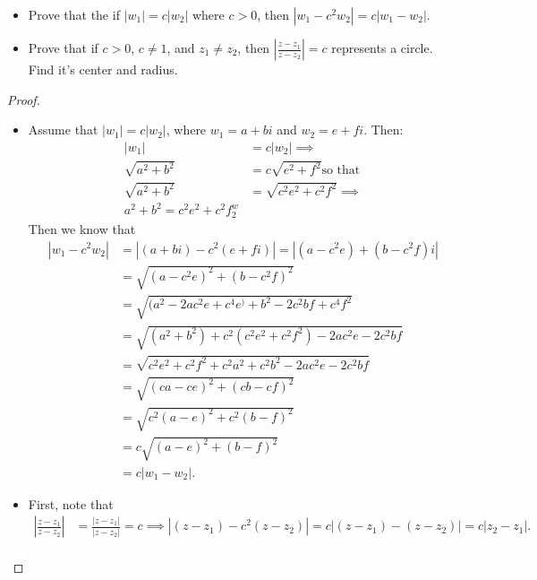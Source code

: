 \documentclass[12pt]{article}
\newenvironment{statement}[2][Statement]{\begin{trivlist}
\item[\hskip \labelsep {\bfseries #1}\hskip \labelsep {\bfseries #2.}]}{\end{trivlist}}
\begin{document}
\begin{statement}[Problem]{4}
  \begin{itemize}
    \item[(a)] Prove that the if $|w_1|=c|w_2|$ where $c > 0$, then $|w_1 - c^2 w_2| = c|w_1-w_2|$.
    \item[(b)] Prove that if $c >0$, $c \neq 1$, and $z_1 \neq z_2$, then $| \frac{z-z_1}{z-z_2} | = c$ represents a circle. 
      Find it's center and radius. 
  \end{itemize}
\end{statement}
\begin{proof}
  \begin{itemize}
    \item[(a)] Assume that $|w_1|=c|w_2|$, where $w_1=a+bi$ and $w_2=e+fi$. Then: 
      \begin{align*}
        |w_1| &= c|w_2| \implies \\
        \sqrt{a^2+b^2} &= c \sqrt{e^2+f^2} \text{so that} \\
        \sqrt{a^2+b^2} &= \sqrt{c^2e^2+c^2f^2} \implies \\
        a^2+b^2 = c^2e^2 + c^2f^w_2
      \end{align*}
      Then we know that 
      \begin{align*}
        |w_1 - c^2w_2| &= |(a+bi) - c^2(e+fi)|=|(a-c^2e)+(b-c^2f)i| \\
                       &= \sqrt{(a-c^2e)^2 + (b-c^ 2f)^2} \\
                       &= \sqrt{(a^2-2ac^2e+c^4e^)+b^2-2c^2bf+c^4f^2} \\
                       &= \sqrt{(a^2+b^2) + c^2(c^2e^2+c^2f^2)-2ac^2e-2c^2bf} \\
                       &= \sqrt{c^2e^2 + c^2f^2 +c^2a^2+c^2b^2-2ac^2e-2c^2bf} \\
                       &= \sqrt{(ca-ce)^2 + (cb-cf)^2} \\
                       &= \sqrt{c^2(a-e)^2 + c^2(b-f)^2} \\
                       &= c \sqrt{(a-e)^2 + (b-f)^2} \\
                       &= c|w_1-w_2|.
      \end{align*}
    \item[(b)] First, note that 
      \begin{align*}
        | \frac{z-z_1}{z-z_2}| &= \frac{|z-z_1|}{|z-z_2|} = c 
        \implies | (z-z_1) - c^2(z-z_2)| = c|(z-z_1)-(z-z_2)|=c|z_2-z_1|. \\

\end{align*}
\end{itemize}
\end{proof}
\end{document}
